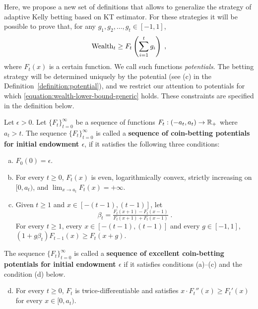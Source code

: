 Here, we propose a new set of definitions that allows to generalize the
strategy of adaptive Kelly betting based on KT estimator. For these strategies
it will be possible to prove that, for any $g_1, g_2, \dots, g_t \in [-1,1]$,
\begin{equation}
\label{equation:wealth-lower-bound-generic}
\operatorname{Wealth}_t \ge F_t \left( \sum_{i=1}^t g_i \right) \; ,
\end{equation}
where $F_t(x)$ is a certain function. We call such functions \emph{potentials}.
The betting strategy will be determined uniquely by the potential (see (c) in
the Definition~\ref{definition:potential}), and we restrict our attention to
potentials for which \eqref{equation:wealth-lower-bound-generic} holds. These
constraints are specified in the definition below.
\begin{definition}
\label{definition:potential}
Let $\epsilon > 0$. Let $\{F_t\}_{t=0}^\infty$ be a sequence of functions
$F_t:(-a_t, a_t)  \to \mathbb{R}_+$ where $a_t > t$.  The sequence
$\{F_t\}_{t=0}^\infty$ is called a \textbf{sequence of coin-betting potentials
for initial endowment $\epsilon$}, if it satisfies the following three
conditions:
\begin{enumerate}[(a)]
\item $F_0(0) = \epsilon$.

\item For every $t \ge 0$, $F_t(x)$ is even, logarithmically convex, strictly
increasing on $[0,a_t)$, and
$\lim_{x \to a_t} F_t(x) = +\infty$.
\item Given $t \ge 1$ and $x \in [-(t-1), (t-1)]$, let
\begin{equation}
\label{equation:potential-based-strategy}
\beta_t=\tfrac{F_t(x + 1) - F_t(x - 1)}{F_t(x + 1) + F_t(x - 1)} \;.
\end{equation}
For every $t \ge 1$, every $x \in [-(t-1), (t-1)]$ and every $g \in [-1,1]$, $\left(1 + g \beta_t \right) F_{t-1}(x) \ge F_t(x+g)$.
\end{enumerate}
The sequence $\{F_t\}_{t=0}^\infty$ is called a
\textbf{sequence of excellent coin-betting potentials for initial
endowment $\epsilon$} if it satisfies conditions (a)--(c) and the condition (d)
below.
\begin{enumerate}[(a)]
\setcounter{enumi}{3}
\item For every $t \ge 0$, $F_t$ is twice-differentiable and
satisfies $x \cdot F_t''(x) \ge F_t'(x)$ for every $x \in [0,a_t)$.
\end{enumerate}
\end{definition}

